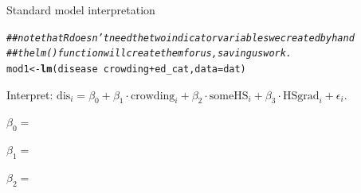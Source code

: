 \documentclass[table]{beamer}\usepackage[]{graphicx}\usepackage[]{color}
\makeatletter
\newcommand{\hlcom}[1]{\textcolor[rgb]{0.678,0.584,0.686}{\textit{#1}}}%
\newcommand{\hlopt}[1]{\textcolor[rgb]{0,0,0}{#1}}%
\newcommand{\hlstd}[1]{\textcolor[rgb]{0.345,0.345,0.345}{#1}}%
\newcommand{\hlkwb}[1]{\textcolor[rgb]{0.69,0.353,0.396}{#1}}%
\newcommand{\hlkwc}[1]{\textcolor[rgb]{0.333,0.667,0.333}{#1}}%
\newcommand{\hlkwd}[1]{\textcolor[rgb]{0.737,0.353,0.396}{\textbf{#1}}}%
\newenvironment{kframe}{%
 \def\at@end@of@kframe{}%
 \ifinner\ifhmode%
  \def\at@end@of@kframe{\end{minipage}}%
  \begin{minipage}{\columnwidth}%
 \fi\fi%
 \def\FrameCommand##1{\hskip\@totalleftmargin \hskip-\fboxsep
 \colorbox{shadecolor}{##1}\hskip-\fboxsep
     \hskip-\linewidth \hskip-\@totalleftmargin \hskip\columnwidth}%
 \MakeFramed {\advance\hsize-\width
   \@totalleftmargin\z@ \linewidth\hsize
   \@setminipage}}%
 {\par\unskip\endMakeFramed%
 \at@end@of@kframe}
\newenvironment{knitrout}{}{} %
\makeatother
\begin{document}
\begin{frame}[fragile]{Standard model interpretation}

\begin{knitrout}\scriptsize
{}\color{fgcolor}\begin{kframe}
\begin{alltt}
\hlcom{## note that R doesn't need the two indicator variables we created by hand}
\hlcom{## the lm() function will create them for us, saving us work.}
\hlstd{mod1} \hlkwb{<-} \hlkwd{lm}\hlstd{(disease} \hlopt{~} \hlstd{crowding} \hlopt{+} \hlstd{ed_cat,} \hlkwc{data}\hlstd{=dat)}
\end{alltt}
\end{kframe}
\end{knitrout}

Interpret:  $ \mbox{dis}_i = \beta_0 + \beta_1 \cdot \mbox{crowding}_i + \beta_2 \cdot \mbox{someHS}_{i} + \beta_{3} \cdot \mbox{HSgrad}_{i} + \epsilon_{i}$.

\bigskip

$\beta_0 = $

\vspace{1.5cm}

$\beta_1 = $

\vspace{1.5cm}

$\beta_2 = $


\end{frame}


%
%
%
%
%
%
%
%

\end{document}
